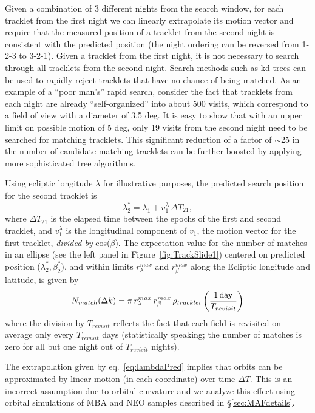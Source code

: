 Given a combination of 3 different nights from the search window, for each tracklet
from the first night we can linearly extrapolate its motion vector and require that the
measured  position of a tracklet from the second night is consistent with the predicted
position (the night ordering can be reversed from 1-2-3 to 3-2-1). Given a tracklet from
the first night, it is not necessary to search through all tracklets from the second night.
Search methods such as kd-trees can be used to rapidly reject tracklets that have no
chance of being matched. As an example of a ``poor man's'' rapid search, consider the
fact that tracklets from each night are already ``self-organized'' into about 500 visits,
which correspond to a field of view with a diameter of 3.5 deg. It is easy to show that with
an upper limit on possible motion of 5 deg, only 19 visits from the second night need to be
searched for matching tracklets. This significant reduction of a factor of $\sim$25 in
the number of candidate matching tracklets can be further boosted by applying more
sophisticated tree algorithms.

Using ecliptic longitude $\lambda$ for illustrative purposes, the predicted search position for the
second tracklet is
\begin{equation}
\label{eq:lambdaPred}
               \lambda_2^\ast = \lambda_1 + v_1^\lambda \, \Delta T_{21},
\end{equation}
where $\Delta T_{21}$ is the elapsed time between the epochs of the first and second tracklet,
and $v_1^\lambda$ is the longitudinal component of $v_1$, the motion vector for the first
tracklet, {\it divided by} cos($\beta$). The expectation value for the number of matches in
an ellipse (see the left panel in Figure~\ref{fig:TrackSlide1})
centered on predicted position ($\lambda_2^\ast, \beta_2^\ast$), and within limits $r_\lambda^{max}$
and  $r_\beta^{max}$ along the Ecliptic longitude and latitude, is given by
\begin{equation}
\label{eq:Nmdk}
     N_{match}(\Delta k) = \pi \, r_\lambda^{max} \, r_\beta^{max}  \, \rho_{tracklet} \left({1 \, {\rm day} \over T_{revisit}}\right)
\end{equation}
where the division by $T_{revisit}$ reflects the fact that each field is revisited on average only
every $T_{revisit}$ days (statistically speaking; the number of matches is zero for all but one
night out of $T_{revisit}$ nights).

The extrapolation given by eq.~\ref{eq:lambdaPred} implies that orbits can be approximated by
linear motion (in each coordinate) over time $\Delta T$. This is an incorrect assumption
due to orbital curvature and we analyze this effect using orbital simulations of MBA and NEO
samples described in \S\ref{sec:MAFdetails}.

